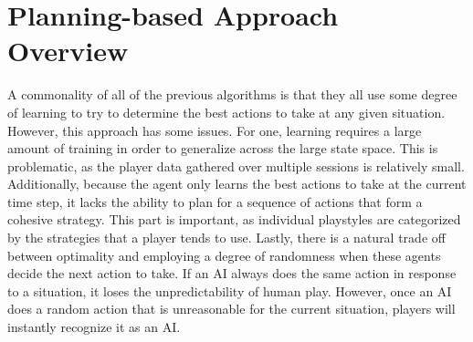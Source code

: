 \chapter{Planning-based Approach Overview}

\label{Chapter3} %

A commonality of all of the previous algorithms is that they all use some degree of learning to try to determine the best actions to take at any given situation. However, this approach has some issues. For one, learning requires a large amount of training in order to generalize across the large state space. This is problematic, as the player data gathered over multiple sessions is relatively small. Additionally, because the agent only learns the best actions to take at the current time step, it lacks the ability to plan for a sequence of actions that form a cohesive strategy. This part is important, as individual playstyles are categorized by the strategies that a player tends to use. Lastly, there is a natural trade off between optimality and employing a degree of randomness when these agents decide the next action to take. If an AI always does the same action in response to a situation, it loses the unpredictability of human play. However, once an AI does a random action that is unreasonable for the current situation, players will instantly recognize it as an AI. 

